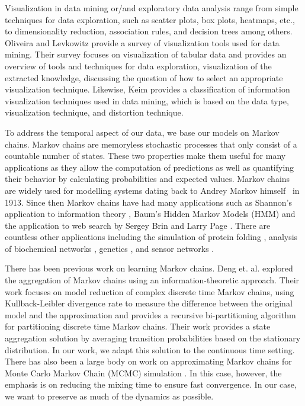 Visualization in data mining or/and exploratory data analysis range from simple techniques for data exploration, such as
scatter plots, box plots, heatmaps, etc., to dimensionality reduction, %
association rules, and decision trees among others.  %
%
Oliveira and Levkowitz \cite{1207445} provide a survey of visualization tools used for data mining. Their survey focuses
on visualization of tabular data and provides an overview of tools and techniques for data exploration,
visualization of the extracted knowledge, discussing the question of how to select an appropriate visualization
technique.
%
Likewise, Keim \cite{981847} provides a classification of information visualization techniques used in data mining, which is based on
the data type, visualization technique, and distortion technique.

To address the temporal aspect of our data, we base our models on  Markov chains. Markov chains are memoryless stochastic processes that only consist of a countable number of states. These two properties make them useful for many applications as they allow the computation of predictions as
well as quantifying their behavior by calculating probabilities and expected values. Markov chains are widely used for modelling systems dating back to Andrey Markov himself~\cite{markov13} in 1913. Since then
Markov chains have had many applications such as Shannon's application to information theory \cite{Shannon:1948},
Baum's Hidden Markov Models (HMM) \cite{baum1970} and the application to web search by Sergey Brin and Larry Page \cite{Lawrence981}. 
%
There are countless other applications including the simulation of protein folding \cite{pande-beauchamp-bowman:2010:methods:markov-model-review},
analysis of biochemical networks \cite{Ciocchetta2009145},
genetics \cite{Huelsenbeck2310}, and 
sensor networks \cite{DBLP:journals/corr/AlsheikhHNTL15}.%

There has been previous work on learning Markov chains. Deng et. al. \cite{5746509} explored the aggregation of Markov chains using an information-theoretic
approach. Their work focuses on model reduction of complex discrete time Markov chains, using Kullback-Leibler divergence
rate to measure the difference between the original model and the approximation and provides a recursive bi-partitioning
algorithm for partitioning discrete time Markov chains. Their work provides a state aggregation solution by averaging
transition probabilities based on the stationary distribution. In our work, we adapt this solution to the continuous time
setting.
%
There has also been a large body on work on approximating Markov chains for Monte Carlo Markov Chain (MCMC) simulation \cite{RSSD:RSSD117,HASTINGS01041970}.
In this case, however, the emphasis is on reducing the mixing time to ensure fast convergence. In our case, we want to preserve as much of the dynamics as possible. 


